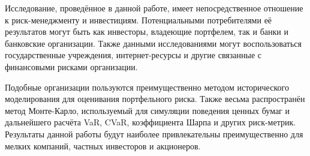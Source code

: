Исследование, проведённое в данной работе, имеет непосредственное отношение к риск-менеджменту и инвестициям. 
Потенциальными потребителями её результатов могут быть как инвесторы, владеющие портфелем, так и банки и банковские организации. 
Также данными исследованиями могут воспользоваться государственные учреждения, интернет-ресурсы и другие связанные с финансовыми рисками организации.

Подобные организации пользуются преимущественно методом исторического моделирования для оценивания портфельного риска.
Также весьма распространён метод Монте-Карло, используемый для симуляции поведения ценных бумаг и дальнейшего расчёта VaR, CVaR, коэффициента Шарпа и других риск-метрик.
Результаты данной работы будут наиболее привлекательны преимущественно для мелких компаний, частных инвесторов и акционеров.



